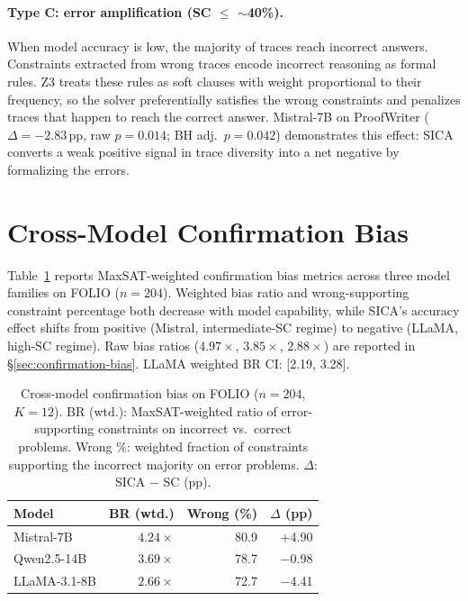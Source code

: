 \paragraph{Type C: error amplification (SC $\leq$ $\sim$40\%).} When model accuracy is low, the majority of traces reach incorrect answers. Constraints extracted from wrong traces encode incorrect reasoning as formal rules. Z3 treats these rules as soft clauses with weight proportional to their frequency, so the solver preferentially satisfies the wrong constraints and penalizes traces that happen to reach the correct answer. Mistral-7B on ProofWriter ($\Delta = -2.83$\,pp, raw $p = 0.014$; BH adj.\ $p = 0.042$) demonstrates this effect: SICA converts a weak positive signal in trace diversity into a net negative by formalizing the errors.


\section{Cross-Model Confirmation Bias}
\label{app:cross-model-bias}

Table~\ref{tab:cross-model-bias} reports MaxSAT-weighted confirmation bias metrics across three model families on FOLIO ($n = 204$). Weighted bias ratio and wrong-supporting constraint percentage both decrease with model capability, while SICA's accuracy effect shifts from positive (Mistral, intermediate-SC regime) to negative (LLaMA, high-SC regime). Raw bias ratios ($4.97\times$, $3.85\times$, $2.88\times$) are reported in \S\ref{sec:confirmation-bias}. LLaMA weighted BR CI: [2.19, 3.28].

\begin{table}[h]
\centering
\small
\caption{Cross-model confirmation bias on FOLIO ($n = 204$, $K = 12$). BR (wtd.): MaxSAT-weighted ratio of error-supporting constraints on incorrect vs.\ correct problems. Wrong \%: weighted fraction of constraints supporting the incorrect majority on error problems. $\Delta$: SICA $-$ SC (pp).}
\label{tab:cross-model-bias}
\begin{tabular}{@{}lrrr@{}}
\toprule
Model & BR (wtd.) & Wrong (\%) & $\Delta$ (pp) \\
\midrule
Mistral-7B & $4.24\times$ & 80.9 & $+$4.90 \\
Qwen2.5-14B & $3.69\times$ & 78.7 & $-$0.98 \\
LLaMA-3.1-8B & $2.66\times$ & 72.7 & $-$4.41 \\
\bottomrule
\end{tabular}
\end{table}

